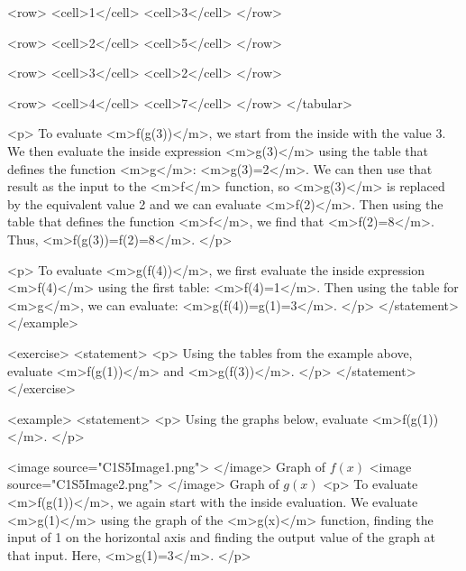                     <row>
                        <cell>1</cell>
                        <cell>3</cell>
                    </row>

                    <row>
                        <cell>2</cell>
                        <cell>5</cell>
                    </row>

                    <row>
                        <cell>3</cell>
                        <cell>2</cell>
                    </row>

                    <row>
                        <cell>4</cell>
                        <cell>7</cell>
                    </row>
                </tabular>

                <p>
                    To evaluate <m>f(g(3))</m>, we start from the inside with the value 3.
                    We then evaluate the inside expression <m>g(3)</m> using the table that defines the function <m>g</m>: <m>g(3)=2</m>.
                    We can then use that result as the input to the <m>f</m> function, so <m>g(3)</m> is replaced by the equivalent value 2 and we can evaluate <m>f(2)</m>.
                    Then using the table that defines the function <m>f</m>, we find that <m>f(2)=8</m>.
                    Thus, <m>f(g(3))=f(2)=8</m>.
                </p>

                <p>
                    To evaluate <m>g(f(4))</m>, we first evaluate the inside expression <m>f(4)</m> using the first table: <m>f(4)=1</m>.
                    Then using the table for <m>g</m>, we can evaluate: <m>g(f(4))=g(1)=3</m>.
                </p>
            </statement>
        </example>

        <exercise>
            <statement>
                <p>
                    Using the tables from the example above, evaluate <m>f(g(1))</m> and <m>g(f(3))</m>.
                </p>
            </statement>
        </exercise>

        <example>
            <statement>
                <p>
                    Using the graphs below, evaluate <m>f(g(1))</m>.
                </p>

                <image source="C1S5Image1.png">
                </image>
                Graph of $f(x)$
                <image source="C1S5Image2.png">
                </image>
                Graph of $g(x)$
                <p>
                    To evaluate <m>f(g(1))</m>, we again start with the inside evaluation.
                    We evaluate <m>g(1)</m> using the graph of the <m>g(x)</m> function, finding the input of 1 on the horizontal axis and finding the output value of the graph at that input.
                    Here, <m>g(1)=3</m>.
                </p>

